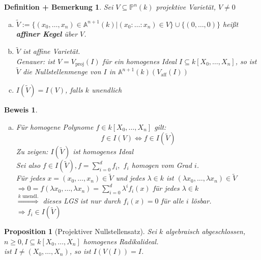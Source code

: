 \documentclass[a4paper,12pt]{report}
\theoremstyle{break}
\newtheorem{DefBem}[Def]{Definition + Bemerkung}
\newtheorem{Prop}[Def]{Proposition}
\theoremstyle{nonumberbreak}
\newtheorem{Bew}{Beweis}
\theoremstyle{nonumberplain}
\newcommand{\emp}[1]{\textbf{\emph{#1}}}
\newcommand{\begriff}[1]{{\index{#1}}\emp{#1}}
\newcommand{\A}{\mathbb{A}}
\newcommand{\IP}{\mathbb{P}}%
\begin{document}
\begin{DefBem}\label{bem10.7}
Sei $V\subseteq \IP^n(k)$ projektive Variet\"at, $V\ne0$
\begin{enumerate}[a)]
\item
	$\widetilde V:=\{(x_0,\ldots ,x_n)\in \A^{n+1}(k)|(x_0:\ldots :x_n)\in V\}\cup\{(0,\ldots ,0)\}$ hei\ss t \begriff{affiner Kegel} \"uber $V$.

\item
	$\widetilde V$ ist affine Variet\"at.\\
	Genauer: ist $V=V_{\text{proj}}(I)$ f\"ur ein homogenes Ideal $I\subseteq k[X_0,\ldots ,X_n]$, so ist $\widetilde V$ die Nullstellenmenge von $I$ in $\A^{n+1}(k)(V_{\text{aff}}(I))$
\item\label{bem10.7c}
	$I(\widetilde V)=I(V)$, falls $k$ unendlich
\end{enumerate}\end{DefBem}

\begin{Bew}\begin{enumerate}[a)]\item[c)]
F\"ur homogene Polynome $f\in k[X_0,\ldots ,X_n]$ gilt:
	\[f\in I(V) \Leftrightarrow f\in I(\widetilde V)\]
\emph{Zu zeigen:} $I(\widetilde V)$ ist homogenes Ideal\\
Sei also $f\in I(\widetilde V), f=\sum\limits_{i=0}^d f_i,$ $f_i$ homogen vom Grad $i$.\\
F\"ur jedes $x=(x_0,\ldots ,x_n) \in \widetilde V$ und jedes $\lambda\in k$ ist $(\lambda x_0,\ldots ,\lambda x_n)\in \widetilde V$\\
$\Rightarrow 0=f(\lambda x_0,\ldots ,\lambda x_n)= \sum\limits_{i=0}^d\lambda^if_i(x)$ f\"ur jedes $\lambda\in k$\\
$\overset{k\text{ unendl.}}{\Longrightarrow} $ dieses LGS ist nur durch $f_i(x)=0$ f\"ur alle $i$ l\"osbar.\\
$\Rightarrow f_i\in I(\widetilde V)$
\end{enumerate}\end{Bew}

\begin{Prop}[Projektiver Nullstellensatz]
Sei $k$ algebraisch abgeschlossen, $n\ge0, I\subseteq k[X_0,\ldots ,X_n]$ homogenes Radikalideal.\\
ist $I\not=(X_0,\ldots ,X_n)$, so ist $I(V(I))=I$.
\end{Prop}
\end{document}
